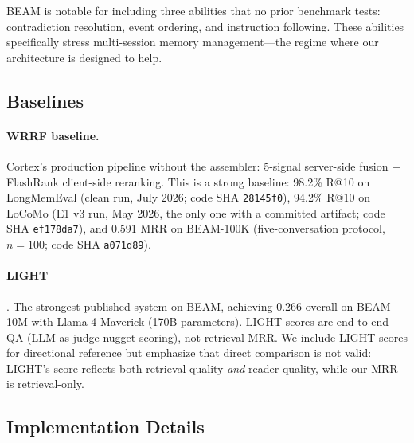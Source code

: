 \documentclass[11pt]{article}
\begin{document}
BEAM is notable for including three abilities that no prior benchmark
tests: contradiction resolution, event ordering, and instruction
following.  These abilities specifically stress multi-session memory
management---the regime where our architecture is designed to help.

\subsection{Baselines}
\label{sec:baselines}

\paragraph{WRRF baseline.}
Cortex's production pipeline without the assembler: 5-signal
server-side fusion + FlashRank client-side reranking.  This is a
strong baseline: 98.2\% R@10 on LongMemEval (clean run, July 2026;
code SHA \texttt{28145f0}), 94.2\% R@10 on LoCoMo (E1 v3 run, May
2026, the only one with a committed artifact; code SHA
\texttt{ef178da7}), and 0.591 MRR on
BEAM-100K (five-conversation protocol, $n{=}100$; code SHA
\texttt{a071d89}).

\paragraph{LIGHT} \citep{Tavakoli2026}.
The strongest published system on BEAM, achieving 0.266 overall on
BEAM-10M with Llama-4-Maverick (170B parameters).  LIGHT scores are
end-to-end QA (LLM-as-judge nugget scoring), not retrieval MRR.  We
include LIGHT scores for directional reference but emphasize that
direct comparison is not valid: LIGHT's score reflects both retrieval
quality \emph{and} reader quality, while our MRR is retrieval-only.

\subsection{Implementation Details}
\label{sec:impl-details}
\end{document}

